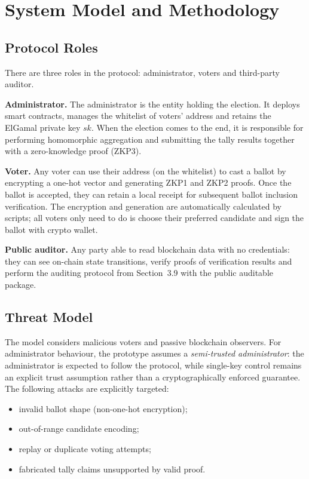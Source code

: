 \chapter{System Model and Methodology}
\begingroup
\justifying
\setlength{\parindent}{0pt}
\setlength{\parskip}{0.5\baselineskip}
\titlespacing{\chapter}{0pt}{0pt}{0pt}
\titlespacing{\section}{0pt}{0pt}{0pt}

\section{Protocol Roles}

There are three roles in the protocol: administrator, voters and third-party auditor.

\textbf{Administrator.} The administrator is the entity holding the election. It deploys smart contracts, manages the whitelist of voters' address and retains the ElGamal private key $\mathit{sk}$. When the election comes to the end, it is responsible for performing homomorphic aggregation and submitting the tally results together with a zero-knowledge proof (ZKP3).

\textbf{Voter.} Any voter can use their address (on the whitelist) to cast a ballot by encrypting a one-hot vector and generating ZKP1 and ZKP2 proofs. Once the ballot is accepted, they can retain a local receipt for subsequent ballot inclusion verification. The encryption and generation are automatically calculated by scripts; all voters only need to do is choose their preferred candidate and sign the ballot with crypto wallet.

\textbf{Public auditor.} Any party able to read blockchain data with no credentials: they can see on-chain state transitions, verify proofs of verification results and perform the auditing protocol from Section~3.9 with the public auditable package.


\section{Threat Model}

The model considers malicious voters and passive blockchain observers. For administrator behaviour, the prototype assumes a \emph{semi-trusted administrator}: the administrator is expected to follow the protocol, while single-key control remains an explicit trust assumption rather than a cryptographically enforced guarantee. The following attacks are explicitly targeted:
\begin{itemize}
    \item invalid ballot shape (non-one-hot encryption);
    \item out-of-range candidate encoding;
    \item replay or duplicate voting attempts;
    \item fabricated tally claims unsupported by valid proof.
\end{itemize}

